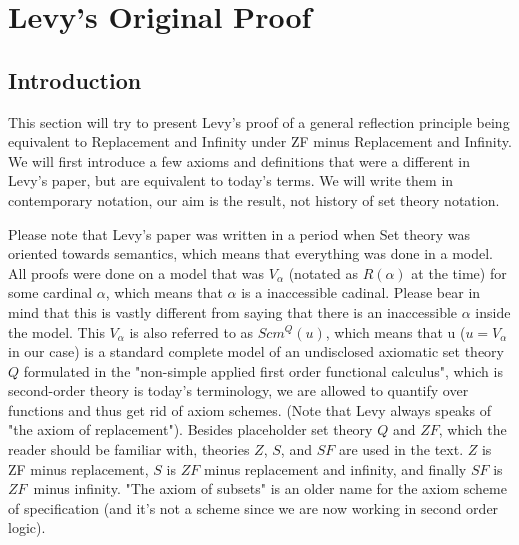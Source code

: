 \documentclass[12pt,a4paper]{article}
\begin{document}

% 


\newpage
\section{Levy's Original Proof}\label{sec:fixed}

\subsection{Introduction}\label{sec:Levy1960}
This section will try to present Levy's proof of a general reflection principle being equivalent to Replacement and Infinity under ZF minus Replacement and Infinity.
We will first introduce a few axioms and definitions that were a different in Levy's paper\cite{Levy60a}, but are equivalent to today's terms. We will write them in contemporary notation, our aim is the result, not history of set theory notation. 

Please note that Levy's paper was written in a period when Set theory was oriented towards semantics, which means that everything was done in a model. All proofs were done on a model that was $V_\alpha$ (notated as $R(\alpha)$ at the time) for some cardinal $\alpha$, which means that $\alpha$ is a inaccessible cadinal. Please bear in mind that this is vastly different from saying that there is an inaccessible $\alpha$ inside the model. This $V_\alpha$ is also referred to as $Scm^Q(u)$, which means that u ($u=V_\alpha$ in our case) is a standard complete model of an undisclosed axiomatic set theory $Q$ formulated in the "non-simple applied first order functional calculus", which is second-order theory is today's terminology, we are allowed to quantify over functions and thus get rid of axiom schemes. (Note that Levy always speaks of "the axiom of replacement"). Besides placeholder set theory $Q$ and $ZF$, which the reader should be familiar with, theories $Z$, $S$, and $SF$ are used in the text. $Z$ is ZF minus replacement, $S$ is $ZF$ minus replacement and infinity, and finally $SF$ is $ZF$ minus infinity. "The axiom of subsets" is an older name for the axiom scheme of specification (and it's not a scheme since we are now working in second order logic). 
\end{document}
